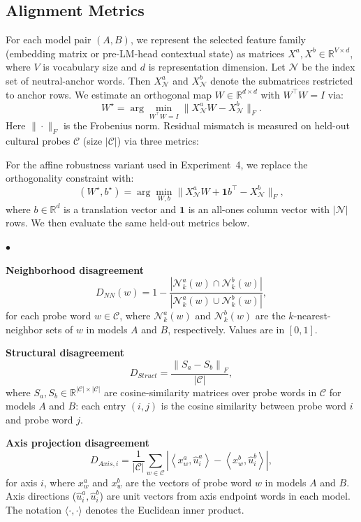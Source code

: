 \documentclass[11pt]{article}
\newcommand{\squishlist}{
    \begin{list}{$\bullet$}
    { \setlength{\itemsep}{0pt}
        \setlength{\parsep}{1pt}
        \setlength{\topsep}{1pt}
        \setlength{\partopsep}{0pt}
        \setlength{\leftmargin}{1em} %
        \setlength{\labelwidth}{1em}
        \setlength{\labelsep}{0.5em} } }
\newcommand{\squishend}{
    \end{list}  }
\begin{document}
\subsection{Alignment Metrics}
\label{sec:metrics}

For each model pair $(A,B)$, we represent the selected feature family (embedding matrix or pre-LM-head contextual state) as matrices $X^a, X^b \in \mathbb{R}^{V\times d}$, where $V$ is vocabulary size and $d$ is representation dimension. Let $\mathcal{N}$ be the index set of neutral-anchor words. Then $X^a_{\mathcal N}$ and $X^b_{\mathcal N}$ denote the submatrices restricted to anchor rows. We estimate an orthogonal map $W\in\mathbb{R}^{d\times d}$ with $W^\top W=I$ via:
\[
W^\star=\arg\min_{W^\top W=I}\|X^a_{\mathcal N}W-X^b_{\mathcal N}\|_F.
\]
Here $\|\cdot\|_F$ is the Frobenius norm. Residual mismatch is measured on held-out cultural probes $\mathcal C$ (size $|\mathcal C|$) via three metrics:

For the affine robustness variant used in Experiment~4, we replace the orthogonality constraint with:
\[
(W^\star,b^\star)=\arg\min_{W,b}\|X^a_{\mathcal N}W+\mathbf{1}b^\top-X^b_{\mathcal N}\|_F,
\]
where $b\in\mathbb{R}^{d}$ is a translation vector and $\mathbf{1}$ is an all-ones column vector with $|\mathcal N|$ rows. We then evaluate the same held-out metrics below.

\squishlist
\item \textbf{Neighborhood disagreement}
\[
D_{NN}(w)=1-\frac{\left|\mathcal N_k^a(w)\cap\mathcal N_k^b(w)\right|}{\left|\mathcal N_k^a(w)\cup\mathcal N_k^b(w)\right|},
\]
for each probe word $w\in\mathcal C$, where $\mathcal N_k^a(w)$ and $\mathcal N_k^b(w)$ are the $k$-nearest-neighbor sets of $w$ in models $A$ and $B$, respectively. Values are in $[0,1]$.
\item \textbf{Structural disagreement}
\[
D_{Struct}=\frac{\left\|S_a-S_b\right\|_F}{|\mathcal C|},
\]
where $S_a,S_b\in\mathbb{R}^{|\mathcal C|\times|\mathcal C|}$ are cosine-similarity matrices over probe words in $\mathcal C$ for models $A$ and $B$: each entry $(i,j)$ is the cosine similarity between probe word $i$ and probe word $j$.
\item \textbf{Axis projection disagreement}
\[
D_{Axis,i}=\frac{1}{|\mathcal C|}
\sum_{w\in\mathcal C}
\left|\left\langle x_w^a,\hat u_i^a\right\rangle-\left\langle x_w^b,\hat u_i^b\right\rangle\right|,
\]
for axis $i$, where $x_w^a$ and $x_w^b$ are the vectors of probe word $w$ in models $A$ and $B$. Axis directions ($\hat u_i^a, \hat u_i^b$) are unit vectors from axis endpoint words in each model. The notation $\langle\cdot,\cdot\rangle$ denotes the Euclidean inner product.
\squishend
\end{document}
